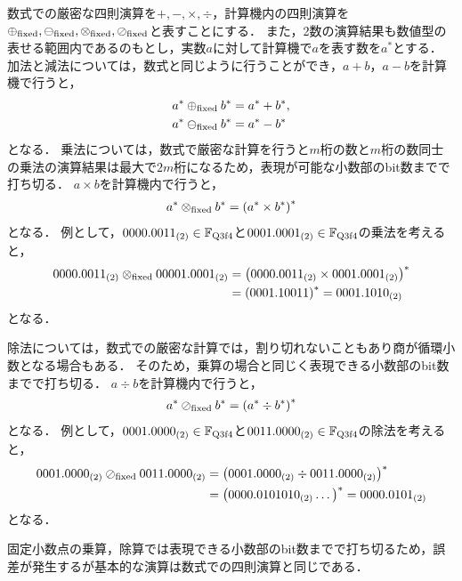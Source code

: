 数式での厳密な四則演算を$+,-,\times,\div$，計算機内の四則演算を$\oplus_{\mathrm{fixed}},\ominus_{\mathrm{fixed}} ,\otimes_{\mathrm{fixed}},\\ \oslash_{\mathrm{fixed}}$と表すことにする．
また，2数の演算結果も数値型の表せる範囲内であるのもとし，実数$a$に対して計算機で$a$を表す数を$a^{\ast}$とする．
加法と減法については，数式と同じように行うことができ，$a+b$，$a-b$を計算機で行うと，
\begin{align*}
    a^{\ast} \oplus_{\mathrm{fixed}} b^{\ast} &= a^{\ast} + b^{\ast}, \\ 
    a^{\ast} \ominus_{\mathrm{fixed}} b^{\ast} &= a^{\ast} - b^{\ast}
\end{align*}
となる．
乗法については，数式で厳密な計算を行うと$m$桁の数と$m$桁の数同士の乗法の演算結果は最大で$2m$桁になるため，表現が可能な小数部のbit数までで打ち切る．
$a \times b$を計算機内で行うと，
\begin{align*}  
    a^{\ast} \otimes_{\mathrm{fixed}} b^{\ast} = \left(a^{\ast} \times b^{\ast}\right)^{\ast}
\end{align*}
となる．
例として，$0000.0011_{(2)} \in \mathbb{F}_{\text{Q}{3}\text{f}{4}}$と$0001.0001_{(2)} \in \mathbb{F}_{\text{Q}{3}\text{f}{4}}$の乗法を考えると，
\begin{align*}
    0000.0011_{(2)} \otimes_{\mathrm{fixed}} 00001.0001_{(2)} &= \left(0000.0011_{(2)} \times 0001.0001_{(2)}\right)^{\ast} \\
    &= \left(0001.10011\right)^{\ast} = 0001.1010_{(2)}
\end{align*}
となる．


除法については，数式での厳密な計算では，割り切れないこともあり商が循環小数となる場合もある．
そのため，乗算の場合と同じく表現できる小数部のbit数までで打ち切る．
$a \div b$を計算機内で行うと，
\begin{align*}
    a^{\ast} \oslash_{\mathrm{fixed}} b^{\ast} = \left(a^{\ast} \div b^{\ast}\right)^{\ast}
\end{align*}
となる．
例として，$0001.0000_{(2)} \in \mathbb{F}_{\text{Q}{3}\text{f}{4}}$と$0011.0000_{(2)} \in \mathbb{F}_{\text{Q}{3}\text{f}{4}}$の除法を考えると，
\begin{align*}
    0001.0000_{(2)} \oslash_{\mathrm{fixed}} 0011.0000_{(2)} &= \left(0001.0000_{(2)} \div 0011.0000_{(2)}\right)^{\ast} \\
    &= \left(0000.0101010_{(2)}\dots\right)^{\ast} = 0000.0101_{(2)}
\end{align*}
となる．


固定小数点の乗算，除算では表現できる小数部のbit数までで打ち切るため，誤差が発生するが基本的な演算は数式での四則演算と同じである．

